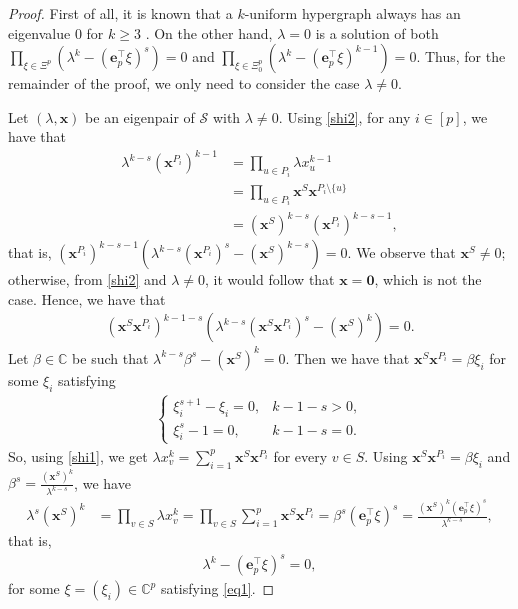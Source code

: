 \documentclass{article}
\begin{document}
\begin{proof}
First of all,
it is known that a $k$-uniform hypergraph always has an eigenvalue $0$ for $k\geq3$ \cite{qi2014h}.
On the other hand,
$\lambda=0$ is a solution of both $\prod_{\xi\in\Xi^{p}}(\lambda^{k}-(\mathbf{e}_{p}^{\top}\xi)^{s})=0$ and $\prod_{\xi\in\Xi_{0}^{p}}(\lambda^{k}-(\mathbf{e}_{p}^{\top}\xi)^{k-1})=0$.
Thus, for the remainder of the proof, we only need to consider the case $\lambda\neq0$.

Let $(\lambda,\mathbf{x})$ be an eigenpair of $\mathcal{S}$ with $\lambda\neq0$.
Using \eqref{shi2}, for any $i\in [p]$, we have that
\begin{align*}
    \lambda^{k-s}(\mathbf{x}^{P_{i}})^{k-1}&=\prod_{u \in P_i}\lambda x_{u}^{k-1}\\
    &=\prod_{u \in P_i}\mathbf{x}^{S}\mathbf{x}^{P_{i}\setminus\{u\}}\\
    &=(\mathbf{x}^{S})^{k-s}(\mathbf{x}^{P_{i}})^{k-s-1},
\end{align*}
that is, $(\mathbf{x}^{P_{i}})^{k-s-1}\left(\lambda^{k-s}(\mathbf{x}^{P_{i}})^{s}-(\mathbf{x}^{S})^{k-s}\right)=0$.
We observe that $\mathbf{x}^{S} \neq 0$;
otherwise, from \eqref{shi2} and $\lambda \neq 0$, it would follow that $\mathbf{x} = \mathbf{0}$,
which is not the case.
Hence, we have that
\begin{align*}
(\mathbf{x}^{S}\mathbf{x}^{P_{i}})^{k-1-s}\left(\lambda^{k-s}(\mathbf{x}^{S}\mathbf{x}^{P_{i}})^{s}-(\mathbf{x}^{S})^{k}\right)=0. %
\end{align*}
Let $\beta \in \mathbb{C}$ be such that $\lambda^{k-s}\beta^{s}-(\mathbf{x}^{S})^{k}=0$. Then we have that $\mathbf{x}^{S}\mathbf{x}^{P_{i}}=\beta \xi_i$ for some $\xi_i$ satisfying
\begin{align}\label{eq1}
    \begin{cases}
        \xi_{i}^{s+1}-\xi_{i}=0, & k-1-s >0,\\
        \xi_{i}^{s}-1=0, &k-1-s=0.
    \end{cases}
\end{align}
So, using \eqref{shi1}, we get $\lambda x_v^k=\sum_{i=1}^{p}\mathbf{x}^{S}\mathbf{x}^{P_{i}}$ for every $v\in S$.
Using $\mathbf{x}^{S}\mathbf{x}^{P_{i}}=\beta \xi_i$ and $\beta^{s}=\frac{(\mathbf{x}^{S})^{k}}{\lambda^{k-s}}$,
we have
\begin{align*}
\lambda^s(\mathbf{x}^{S})^k&=\prod_{v \in S}\lambda x_v^k=\prod_{v \in S}\sum_{i=1}^{p}\mathbf{x}^{S}\mathbf{x}^{P_{i}}=\beta^s( \mathbf{e}_{p}^{\top}\xi)^s=\frac{(\mathbf{x}^{S})^k(\mathbf{e}_{p}^{\top}\xi)^s}{\lambda^{k-s}},
\end{align*}
that is,
\begin{align*}
\lambda^{k}-(\mathbf{e}_{p}^{\top}\xi)^{s}=0,
\end{align*}
for some $\xi =(\xi_i) \in\mathbb{C}^{p}$ satisfying \eqref{eq1}.


\end{proof}
\end{document}
